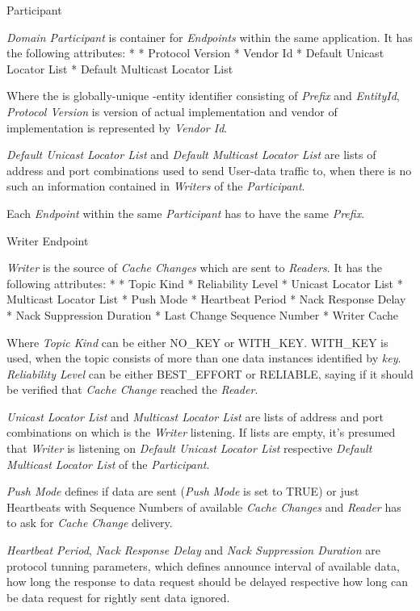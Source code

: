 \secc Participant

{\em Domain Participant} is container for {\em Endpoints} within the same application. It has the following attributes:
\begitems
* 
* Protocol Version
* Vendor Id
* Default Unicast Locator List
* Default Multicast Locator List
\enditems

Where the {\em {}} is globally-unique -entity identifier consisting of {\em {} Prefix} and {\em EntityId}, {\em Protocol Version} is version of actual implementation and vendor of implementation is represented by {\em Vendor Id}.

{\em Default Unicast Locator List} and {\em Default Multicast Locator List} are lists of  address and port combinations used to send User-data traffic to, when there is no such an information contained in {\em Writers} of the {\em Participant}.

Each {\em Endpoint} within the same {\em Participant} has to have the same {\em {} Prefix}.

\secc Writer Endpoint

{\em Writer} is the source of {\em Cache Changes} which are sent to {\em Readers}. It has the following attributes:
\begitems
* 
* Topic Kind
* Reliability Level
* Unicast Locator List
* Multicast Locator List
* Push Mode
* Heartbeat Period
* Nack Response Delay
* Nack Suppression Duration
* Last Change Sequence Number
* Writer Cache
\enditems

Where {\em Topic Kind} can be either NO\_KEY or WITH\_KEY. WITH\_KEY is used, when the topic consists of more than one data instances identified by {\em key}. {\em Reliability Level} can be either BEST\_EFFORT or RELIABLE, saying if it should be verified that {\em Cache Change} reached the {\em Reader}.

{\em Unicast Locator List} and {\em Multicast Locator List} are lists of  address and port combinations on which is the {\em Writer} listening. If lists are empty, it's presumed that {\em Writer} is listening on {\em Default Unicast Locator List} respective {\em Default Multicast Locator List} of the {\em Participant}.

{\em Push Mode} defines if data are sent ({\em Push Mode} is set to TRUE) or just Heartbeats with Sequence Numbers of available {\em Cache Changes} and {\em Reader} has to ask for {\em Cache Change} delivery.

{\em Heartbeat Period}, {\em Nack Response Delay} and {\em Nack Suppression Duration} are protocol tunning parameters, which defines announce interval of available data, how long the response to data request should be delayed respective how long can be data request for rightly sent data ignored.

